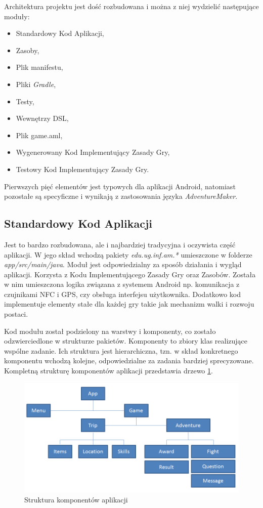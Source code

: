 \documentclass[openright]{xmgr}
\begin{document}
Architektura projektu jest dość rozbudowana i można z niej wydzielić następujące moduły:

\begin{itemize}
	\item Standardowy Kod Aplikacji,
	\item Zasoby,
	\item Plik manifestu,
	\item Pliki \textit{Gradle},
	\item Testy,
	\item Wewnętrzy DSL,
	\item Plik game.aml,
	\item Wygenerowany Kod Implementujący Zasady Gry,
	\item Testowy Kod Implementujący Zasady Gry.
\end{itemize}

Pierwszych pięć elementów jest typowych dla aplikacji Android, natomiast pozostałe są specyficzne i wynikają z zastosowania języka \textit{AdventureMaker}.

\subsection*{Standardowy Kod Aplikacji} 

Jest to bardzo rozbudowana, ale i najbardziej tradycyjna i oczywista część aplikacji. W jego skład wchodzą pakiety \textit{edu.ug.inf.am.*} umieszczone w folderze \textit{app/src/main/java}. Moduł jest odpowiedzialny za sposób działania i wygląd aplikacji. Korzysta z Kodu Implementującego Zasady Gry oraz Zasobów. Została w nim umieszczona logika związana z systemem Android np. komunikacja z czujnikami NFC i GPS, czy obsługa interfejsu użytkownika. Dodatkowo kod implementuje elementy stałe dla każdej gry takie jak mechanizm walki i rozwoju postaci.

Kod modułu został podzielony na warstwy i komponenty, co zostało odzwierciedlone w strukturze pakietów. 
Komponenty to zbiory klas realizujące wspólne zadanie. Ich struktura jest hierarchiczna, tzn. w skład konkretnego komponentu wchodzą kolejne, odpowiedzialne za zadania bardziej sprecyzowane. Kompletną strukturę komponentów aplikacji przedstawia drzewo \ref{modules:tree}.

\begin{figure}[!tbh]
	\centering
	\includegraphics[width=1.0\hsize]{fig/modules_tree}
	\caption{Struktura komponentów aplikacji}
	\label{modules:tree}
\end{figure}
\end{document}
